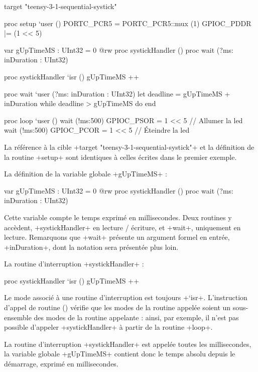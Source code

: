 \begin{PLM}[1]
target "teensy-3-1-sequential-systick"

proc setup `user () {
  PORTC_PCR5 = PORTC_PCR5::mux (1)
  GPIOC_PDDR |= (1 << 5)
}

var gUpTimeMS : UInt32 = 0 {
  @rw proc systickHandler ()
  proc wait (?ms: inDuration : UInt32)
}

proc systickHandler `isr () {
  gUpTimeMS ++
}

proc wait `user (?ms: inDuration : UInt32) {
  let deadline = gUpTimeMS + inDuration
  while deadline > gUpTimeMS do
  end
}

proc loop `user () {
  wait (!ms:500)
  GPIOC_PSOR = 1 << 5 // Allumer la led
  wait (!ms:500)
  GPIOC_PCOR = 1 << 5  // Éteindre la led
}
\end{PLM}

La référence à la cible \plm+target "teensy-3-1-sequential-systick"+ et la définition de la routine \plm+setup+ sont identiques à celles écrites dans le premier exemple.

La définition de la variable globale \plm+gUpTimeMS+ :

\begin{PLM}[8]
var gUpTimeMS : UInt32 = 0 {
  @rw proc systickHandler ()
  proc wait (?ms: inDuration : UInt32)
}
\end{PLM}

Cette variable compte le temps exprimé en millisecondes. Deux routines y accèdent, \plm+systickHandler+ en lecture / écriture, et \plm+wait+, uniquement en lecture. Remarquons que \plm+wait+ présente un argument formel en entrée, \plm+inDuration+, dont la notation sera présentée plus loin.

La routine d'interruption \plm+systickHandler+ :

\begin{PLM}[13]
proc systickHandler `isr () {
  gUpTimeMS ++
}
\end{PLM}

Le mode associé à une routine d'interruption est toujours \plm+`isr+. L'instruction d'appel de routine () vérifie que les modes de la routine appelée soient un sous-ensemble des modes de la routine appelante : ainsi, par exemple, il n'est pas possible d'appeler \plm+systickHandler+ à partir de la routine \plm+loop+.

La routine d'interruption \plm+systickHandler+ est appelée toutes les millisecondes, la variable globale \plm+gUpTimeMS+ contient donc le temps absolu depuis le démarrage, exprimé en millisecondes.

